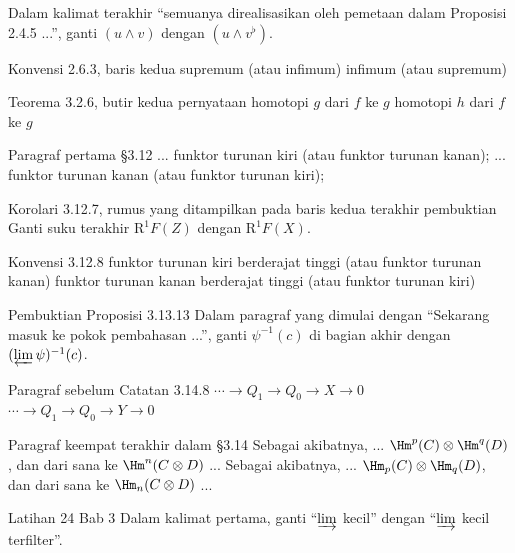 \documentclass{AJerrata}
\begin{document}
\begin{Errata}
		Dalam kalimat terakhir ``semuanya direalisasikan oleh pemetaan dalam Proposisi 2.4.5 ...'', ganti $(u \wedge v)$ dengan $(u \wedge v^{\flat})$.
		
		\item[Konvensi 2.6.3, baris kedua]
		\Orig supremum (atau infimum)
		\Corr infimum (atau supremum)
		
		\item[Teorema 3.2.6, butir kedua pernyataan]
		\Orig homotopi $g$ dari $f$ ke $g$
		\Corr homotopi $h$ dari $f$ ke $g$
		
		\item[Paragraf pertama \S 3.12]
		\Orig ... funktor turunan kiri (atau funktor turunan kanan);
		\Corr ... funktor turunan kanan (atau funktor turunan kiri);
		
		\item[Korolari 3.12.7, rumus yang ditampilkan pada baris kedua terakhir pembuktian]
		Ganti suku terakhir $\mathrm{R}^1 F(Z)$ dengan $\mathrm{R}^1 F(X)$.
		
		\item[Konvensi 3.12.8]
		\Orig funktor turunan kiri berderajat tinggi (atau funktor turunan kanan)
		\Corr funktor turunan kanan berderajat tinggi (atau funktor turunan kiri)
		
		\item[Pembuktian Proposisi 3.13.13]
		Dalam paragraf yang dimulai dengan ``Sekarang masuk ke pokok pembahasan ...'', ganti $\psi^{-1}(c)$ di bagian akhir dengan $(\varprojlim \psi)^{-1}(c)$.
		
		\item[Paragraf sebelum Catatan 3.14.8]
		\Orig $\cdots \to Q_1 \to Q_0 \to X \to 0$
		\Corr $\cdots \to Q_1 \to Q_0 \to Y \to 0$
		
		\item[Paragraf keempat terakhir dalam \S 3.14]
		\Orig Sebagai akibatnya, ... $\Hm^p(C) \otimes \Hm^q(D)$, dan dari sana ke $\Hm^n(C \otimes D)$ ...
		\Corr Sebagai akibatnya, ... $\Hm_p(C) \otimes \Hm_q(D)$, dan dari sana ke $\Hm_n(C \otimes D)$ ...
		
		\item[Latihan 24 Bab 3]
		Dalam kalimat pertama, ganti ``$\varinjlim$ kecil'' dengan ``$\varinjlim$ kecil terfilter''.
		

\end{Errata}
\end{document}
